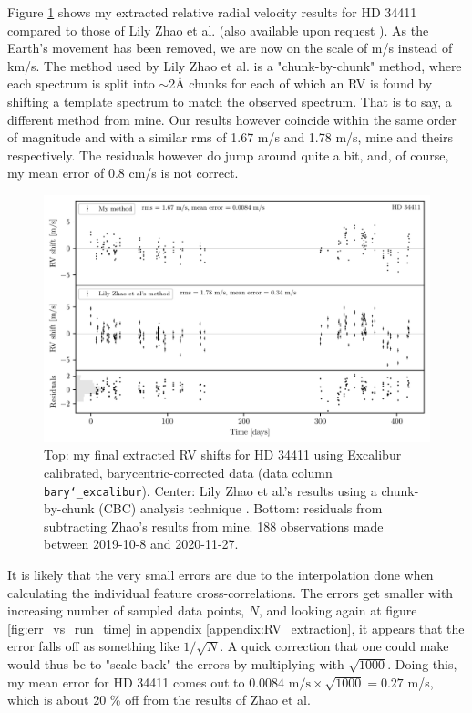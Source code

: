 Figure \ref{fig:HD34411_rvs} shows my extracted relative radial velocity results for HD 34411 compared to those of Lily Zhao et al. (also available upon request \cite{yale_data}). As the Earth's movement has been removed, we are now on the scale of m/s instead of km/s. The method used by Lily Zhao et al. is a "chunk-by-chunk" method, where each spectrum is split into $\sim$2Å chunks for each of which an RV is found by shifting a template spectrum to match the observed spectrum. That is to say, a different method from mine. Our results however coincide within the same order of magnitude and with a similar rms of 1.67 m/s and 1.78 m/s, mine and theirs respectively. The residuals however do jump around quite a bit, and, of course, my mean error of 0.8 cm/s is not correct. 

\begin{figure}%
    \begin{wide}  
        \includegraphics[width=\textwidth]{figures/HD34411_barycentric_rv_vs_lily.pdf}
        \caption{Top: my final extracted RV shifts for HD 34411 using Excalibur calibrated, barycentric-corrected data (data column \texttt{bary\char`_excalibur}). Center: Lily Zhao et al.'s results using a chunk-by-chunk (CBC) analysis technique \cite{yale_data}. Bottom: residuals from subtracting Zhao's results from mine. 188 observations made between 2019-10-8 and 2020-11-27.}
        \label{fig:HD34411_rvs}
    \end{wide}
\end{figure}

It is likely that the very small errors are due to the interpolation done when calculating the individual feature cross-correlations. The errors get smaller with increasing number of sampled data points, $N$, and looking again at figure \ref{fig:err_vs_run_time} in appendix \ref{appendix:RV_extraction}, it appears that the error falls off as something like $1/\sqrt{N}$. A quick correction that one could make would thus be to "scale back" the errors by multiplying with $\sqrt{1000}$. Doing this, my mean error for HD 34411 comes out to $0.0084 \text{ m/s} \times \sqrt{1000} = 0.27$ m/s, which is about 20 \% off from the results of Zhao et al.


